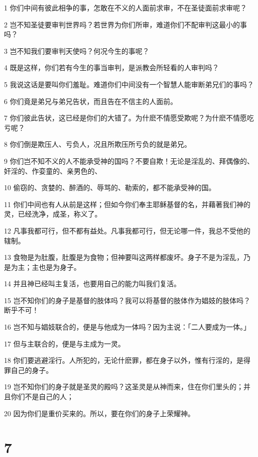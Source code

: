 \par 1 你们中间有彼此相争的事，怎敢在不义的人面前求审，不在圣徒面前求审呢？
\par 2 岂不知圣徒要审判世界吗？若世界为你们所审，难道你们不配审判这最小的事吗？
\par 3 岂不知我们要审判天使吗？何况今生的事呢？
\par 4 既是这样，你们若有今生的事当审判，是派教会所轻看的人审判吗？
\par 5 我说这话是要叫你们羞耻。难道你们中间没有一个智慧人能审断弟兄们的事吗？
\par 6 你们竟是弟兄与弟兄告状，而且告在不信主的人面前。
\par 7 你们彼此告状，这已经是你们的大错了。为什麽不情愿受欺呢？为什麽不情愿吃亏呢？
\par 8 你们倒是欺压人、亏负人，况且所欺压所亏负的就是弟兄。
\par 9 你们岂不知不义的人不能承受神的国吗？不要自欺！无论是淫乱的、拜偶像的、奸淫的、作娈童的、亲男色的、
\par 10 偷窃的、贪婪的、醉酒的、辱骂的、勒索的，都不能承受神的国。
\par 11 你们中间也有人从前是这样；但如今你们奉主耶稣基督的名，并藉著我们神的灵，已经洗净，成圣，称义了。
\par 12 凡事我都可行，但不都有益处。凡事我都可行，但无论哪一件，我总不受他的辖制。
\par 13 食物是为肚腹，肚腹是为食物；但神要叫这两样都废坏。身子不是为淫乱，乃是为主；主也是为身子。
\par 14 并且神已经叫主复活，也要用自己的能力叫我们复活。
\par 15 岂不知你们的身子是基督的肢体吗？我可以将基督的肢体作为娼妓的肢体吗？断乎不可！
\par 16 岂不知与娼妓联合的，便是与他成为一体吗？因为主说：「二人要成为一体。」
\par 17 但与主联合的，便是与主成为一灵。
\par 18 你们要逃避淫行。人所犯的，无论什麽罪，都在身子以外，惟有行淫的，是得罪自己的身子。
\par 19 岂不知你们的身子就是圣灵的殿吗？这圣灵是从神而来，住在你们里头的；并且你们不是自己的人；
\par 20 因为你们是重价买来的。所以，要在你们的身子上荣耀神。

\chapter{7}

